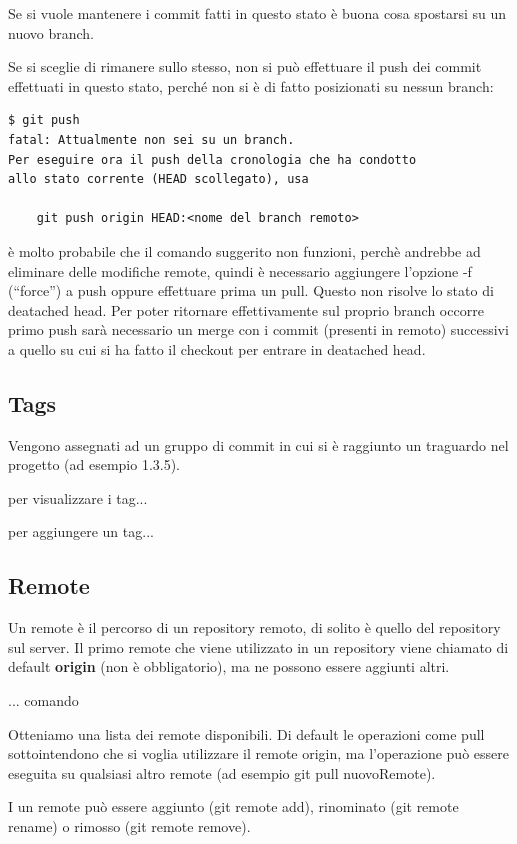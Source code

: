 \documentclass{article} \usepackage[textwidth=18cm,textheight=18cm]{geometry}
\begin{document}
Se si vuole mantenere i commit fatti in questo stato è buona cosa spostarsi su
un nuovo branch.

Se si sceglie di rimanere sullo stesso, non si può effettuare il push dei
commit effettuati in questo stato, perché non si è di fatto posizionati su nessun branch:

\begin{verbatim}
$ git push
fatal: Attualmente non sei su un branch.
Per eseguire ora il push della cronologia che ha condotto
allo stato corrente (HEAD scollegato), usa

    git push origin HEAD:<nome del branch remoto>
\end{verbatim}

è molto probabile che il comando suggerito non funzioni, perchè andrebbe ad
eliminare delle modifiche remote, quindi è necessario aggiungere l'opzione -f
(``force'') a push oppure effettuare prima un pull.
Questo non risolve lo stato di deatached head. Per poter ritornare
effettivamente sul proprio branch occorre 
primo push sarà necessario un merge con i commit (presenti in remoto)
successivi a quello su cui si ha fatto il checkout per entrare in
deatached head.

\subsection{Tags}

Vengono assegnati ad un gruppo di commit in cui si è raggiunto un traguardo nel
progetto (ad esempio 1.3.5).

per visualizzare i tag...

per aggiungere un tag...

\subsection{Remote}

Un remote è il percorso di un repository remoto, di solito è quello del
repository sul server. Il primo remote che viene utilizzato in un repository
viene chiamato di default \textbf{origin} (non è obbligatorio), ma ne possono
essere aggiunti altri.

... comando

Otteniamo una lista dei remote disponibili. Di default le operazioni come pull
sottointendono che si voglia utilizzare il remote origin, ma l'operazione può
essere eseguita su qualsiasi altro remote (ad esempio git pull nuovoRemote).

I un remote può essere aggiunto (git remote add), rinominato (git remote rename)
o rimosso (git remote remove).
\end{document}
